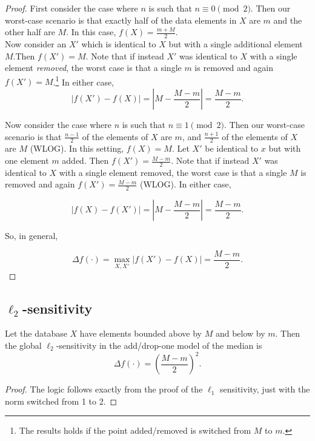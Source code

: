 \documentclass[11pt]{scrartcl} %
\begin{document}
\begin{proof}

First consider the case where $n$ is such that $n \equiv 0 \pmod{2}$. Then our worst-case scenario is that exactly half of the data elements in $X$ are $m$ and the other half are $M$. In this case, $f(X) = \frac{m + M}{2}$. \\

Now consider an $X'$ which is identical to $X$ but with a single additional element $M$.Then $f(X') = M$. Note that if instead $X'$ was identical to $X$ with a single element \textit{removed}, the worst case is that a single $m$ is removed and again $f(X') = M$.\footnote{The results holds if the point added/removed is switched from $M$ to $m$.}  In either case,
$$ \left\vert f(X') - f(X) \right\vert = \left\vert M - \frac{M-m}{2} \right\vert = \frac{M-m}{2}.$$

Now consider the case where $n$ is such that $n \equiv 1 \pmod{2}$.
Then our worst-case scenario is that $\frac{n-1}{2}$ of the elements of $X$ are $m$, and $\frac{n+1}{2}$ of the elements of $X$ are $M$ (WLOG). In this setting, $f(X) = M$. Let $X'$ be identical to $x$ but with one element $m$ added. Then $f(X') = \frac{M-m}{2}$. Note that if instead $X'$ was identical to $X$ with a single element removed, the worst case is that a single $M$ is removed and again $f(X') = \frac{M-m}{2}$ (WLOG). In either case, 

$$ \left\vert f(X) - f(X') \right\vert = \left\vert M - \frac{M-m}{2} \right\vert = \frac{M-m}{2}.$$ 

So, in general, 

$$ \Delta f(\cdot) = \max_{X,X'} \left\vert f(X') - f(X) \right\vert = \frac{M-m}{2}. $$
\end{proof}

\subsection{$\ell_2$-sensitivity}

\begin{theorem}
Let the database $X$ have elements bounded above by $M$ and below by $m$. Then the global $\ell_2$-sensitivity in the add/drop-one model of the median is
$$ \Delta f(\cdot) = \left(\frac{M-m}{2}\right)^2.$$
\end{theorem}

\begin{proof}
The logic follows exactly from the proof of the $\ell_1$ sensitivity, just with the norm switched from 1 to 2.

\end{proof}
\end{document}
